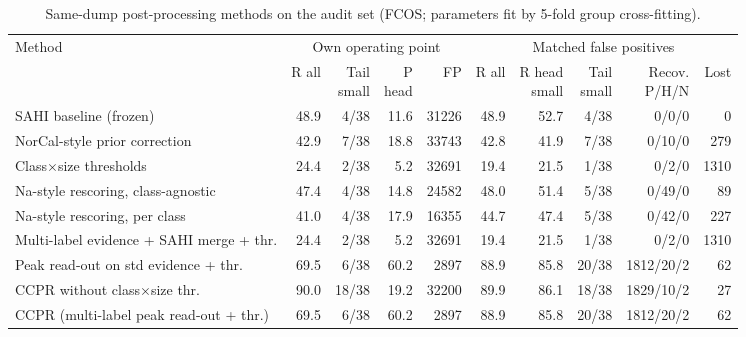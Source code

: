 \begin{table}[!htbp]
\fontsize{6pt}{7pt}\selectfont
\caption{Same-dump post-processing methods on the audit set (FCOS; parameters fit by 5-fold group cross-fitting).}
\label{tab:methods-fcos}
\begin{tabular*}{\textwidth}{@{\extracolsep{\fill}}p{3cm}rrrrrrrrr}
\toprule
Method & \multicolumn{4}{c}{Own operating point} & \multicolumn{5}{c}{Matched false positives} \\ \cmidrule(lr){2-5}\cmidrule(lr){6-10} & R all & \shortstack{Tail\\small} & \shortstack{P\\head} & FP & R all & \shortstack{R head\\small} & \shortstack{Tail\\small} & \shortstack{Recov.\\P/H/N} & Lost \\
\midrule
SAHI baseline (frozen) & 48.9 & 4/38 & 11.6 & 31226 & 48.9 & 52.7 & 4/38 & 0/0/0 & 0 \\
NorCal-style prior correction & 42.9 & 7/38 & 18.8 & 33743 & 42.8 & 41.9 & 7/38 & 0/10/0 & 279 \\
Class$\times$size thresholds & 24.4 & 2/38 & 5.2 & 32691 & 19.4 & 21.5 & 1/38 & 0/2/0 & 1310 \\
Na-style rescoring, class-agnostic & 47.4 & 4/38 & 14.8 & 24582 & 48.0 & 51.4 & 5/38 & 0/49/0 & 89 \\
Na-style rescoring, per class & 41.0 & 4/38 & 17.9 & 16355 & 44.7 & 47.4 & 5/38 & 0/42/0 & 227 \\
Multi-label evidence + SAHI merge + thr. & 24.4 & 2/38 & 5.2 & 32691 & 19.4 & 21.5 & 1/38 & 0/2/0 & 1310 \\
Peak read-out on std evidence + thr. & 69.5 & 6/38 & 60.2 & 2897 & 88.9 & 85.8 & 20/38 & 1812/20/2 & 62 \\
CCPR without class$\times$size thr. & 90.0 & 18/38 & 19.2 & 32200 & 89.9 & 86.1 & 18/38 & 1829/10/2 & 27 \\
CCPR (multi-label peak read-out + thr.) & 69.5 & 6/38 & 60.2 & 2897 & 88.9 & 85.8 & 20/38 & 1812/20/2 & 62 \\
\bottomrule
\end{tabular*}
\end{table}
